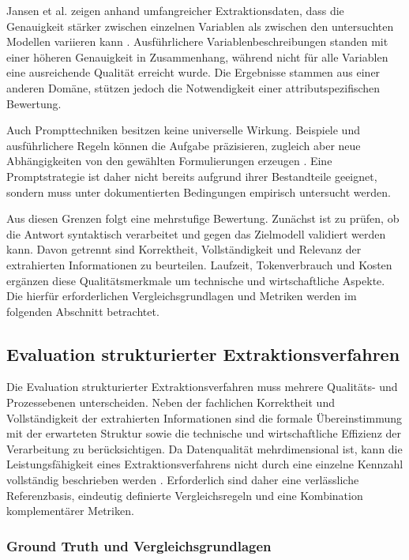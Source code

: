 Jansen et al. zeigen anhand umfangreicher Extraktionsdaten, dass die Genauigkeit stärker zwischen einzelnen Variablen als zwischen den untersuchten Modellen variieren 
kann \cite{data_extraction_ai}. Ausführlichere Variablenbeschreibungen standen mit einer höheren Genauigkeit in Zusammenhang, während nicht für alle Variablen eine 
ausreichende Qualität erreicht wurde. Die Ergebnisse stammen aus einer anderen Domäne, stützen jedoch die Notwendigkeit einer attributspezifischen Bewertung.

Auch Prompttechniken besitzen keine universelle Wirkung. Beispiele und ausführlichere Regeln können die Aufgabe präzisieren, zugleich aber neue Abhängigkeiten von 
den gewählten Formulierungen erzeugen \cite{brunschwiler2025enhancing}. Eine Promptstrategie ist daher nicht bereits aufgrund ihrer Bestandteile geeignet, sondern muss 
unter dokumentierten Bedingungen empirisch untersucht werden.

Aus diesen Grenzen folgt eine mehrstufige Bewertung. Zunächst ist zu prüfen, ob die Antwort syntaktisch verarbeitet und gegen das Zielmodell validiert werden kann. Davon 
getrennt sind Korrektheit, Vollständigkeit und Relevanz der extrahierten Informationen zu beurteilen. Laufzeit, Tokenverbrauch und Kosten ergänzen diese Qualitätsmerkmale 
um technische und wirtschaftliche Aspekte. Die hierfür erforderlichen Vergleichsgrundlagen und Metriken werden im folgenden Abschnitt betrachtet.

\subsection{Evaluation strukturierter Extraktionsverfahren}

Die Evaluation strukturierter Extraktionsverfahren muss mehrere Qualitäts- und Prozessebenen unterscheiden. Neben der fachlichen Korrektheit und Vollständigkeit der 
extrahierten Informationen sind die formale Übereinstimmung mit der erwarteten Struktur sowie die technische und wirtschaftliche Effizienz der Verarbeitung zu berücksichtigen. 
Da Datenqualität mehrdimensional ist, kann die Leistungsfähigkeit eines Extraktionsverfahrens nicht durch eine einzelne Kennzahl vollständig beschrieben werden 
\cite{wang1996beyond,batini2016data}. Erforderlich sind daher eine verlässliche Referenzbasis, eindeutig definierte Vergleichsregeln und eine Kombination komplementärer Metriken.

\subsubsection{Ground Truth und Vergleichsgrundlagen}

